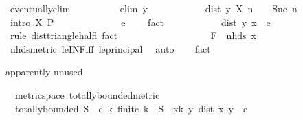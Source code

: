 \begin{isabellebody}
\ eventually{\isacharunderscore}{\kern0pt}elim\isanewline
\ \ \ \ \ \ \ \ \isamarkupfalse%
\ {\isacharparenleft}{\kern0pt}elim\ y{\isacharparenright}{\kern0pt}\isanewline
\ \ \ \ \ \ \ \ \isamarkupfalse%
\ \isamarkupfalse%
\ {\isachardoublequoteopen}dist\ y\ {\isacharparenleft}{\kern0pt}X\ n{\isacharparenright}{\kern0pt}\ {\isacharless}{\kern0pt}\ {}\ {\isacharslash}{\kern0pt}\ Suc\ n{\isachardoublequoteclose}\isanewline
\ \ \ \ \ \ \ \ \ \ \isamarkupfalse%
\ {\isacharparenleft}{\kern0pt}intro\ X\ P{\isacharparenright}{\kern0pt}\isanewline
\ \ \ \ \ \ \ \ \isamarkupfalse%
\ \isamarkupfalse%
\ {\isachardoublequoteopen}{\isasymdots}\ {\isacharless}{\kern0pt}\ e\ {\isacharslash}{\kern0pt}\ {}{\isachardoublequoteclose}\ \isamarkupfalse%
\ fact\isanewline
\ \ \ \ \ \ \ \ \isamarkupfalse%
\ \isamarkupfalse%
\ {\isachardoublequoteopen}dist\ y\ x\ {\isacharless}{\kern0pt}\ e{\isachardoublequoteclose}\isanewline
\ \ \ \ \ \ \ \ \ \ \isamarkupfalse%
\ {\isacharparenleft}{\kern0pt}rule\ dist{\isacharunderscore}{\kern0pt}triangle{\isacharunderscore}{\kern0pt}half{\isacharunderscore}{\kern0pt}l{\isacharparenright}{\kern0pt}\ fact\isanewline
\ \ \ \ \ \ \isamarkupfalse%
\isanewline
\ \ \ \ \isamarkupfalse%
\isanewline
\ \ \ \ \isamarkupfalse%
\ \isamarkupfalse%
\ {\isachardoublequoteopen}F\ {\isasymle}\ nhds\ x{\isachardoublequoteclose}\isanewline
\ \ \ \ \ \ \isamarkupfalse%
\ nhds{\isacharunderscore}{\kern0pt}metric\ le{\isacharunderscore}{\kern0pt}INF{\isacharunderscore}{\kern0pt}iff\ le{\isacharunderscore}{\kern0pt}principal\ \isamarkupfalse%
\ auto\isanewline
\ \ \isamarkupfalse%
\ fact\isanewline
{}\isamarkupfalse%
%
\endisatagproof
{\isafoldproof}%
%
\isadelimproof
%
\endisadelimproof
%
\begin{isamarkuptext}%
apparently unused%
\end{isamarkuptext}\isamarkuptrue%
\isamarkupfalse%
\ {\isacharparenleft}{\kern0pt}\ metric{\isacharunderscore}{\kern0pt}space{\isacharparenright}{\kern0pt}\ totally{\isacharunderscore}{\kern0pt}bounded{\isacharunderscore}{\kern0pt}metric{\isacharcolon}{\kern0pt}\isanewline
\ \ {\isachardoublequoteopen}totally{\isacharunderscore}{\kern0pt}bounded\ S\ {\isasymlongleftrightarrow}\ {\isacharparenleft}{\kern0pt}{\isasymforall}e{\isachargreater}{\kern0pt}{}{\isachardot}{\kern0pt}\ {\isasymexists}k{\isachardot}{\kern0pt}\ finite\ k\ {\isasymand}\ S\ {\isasymsubseteq}\ {\isacharparenleft}{\kern0pt}{\isasymUnion}x{\isasymin}k{\isachardot}{\kern0pt}\ {\isacharbraceleft}{\kern0pt}y{\isachardot}{\kern0pt}\ dist\ x\ y\ {\isacharless}{\kern0pt}\ e{\isacharbraceright}{\kern0pt}{\isacharparenright}{\kern0pt}{\isacharparenright}{\kern0pt}{\isachardoublequoteclose}\isanewline

\end{isabellebody}
